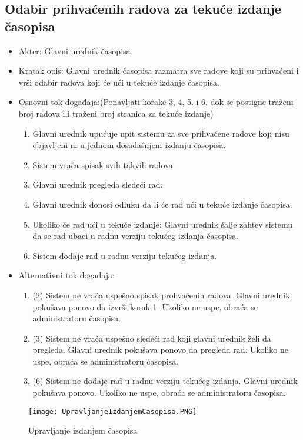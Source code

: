 \documentclass[a4paper]{article}
\begin{document}
\subsection{Odabir prihvaćenih radova za tekuće izdanje časopisa}
\begin{itemize}
    \item Akter: Glavni urednik časopisa
    \item Kratak opis: Glavni urednik časopisa razmatra sve radove koji su prihvaćeni i vrši odabir radova koji će ući u tekuće izdanje časopisa.
    \item Osnovni tok događaja:(Ponavljati korake 3, 4, 5. i 6. dok se postigne traženi broj radova ili traženi broj stranica za tekuće izdanje)
        \begin{enumerate}
            \item Glavni urednik upućuje upit sistemu za sve prihvaćene radove koji nisu objavljeni ni u jednom dosadašnjem izdanju časopisa.
            \item Sistem vraća spisak svih takvih radova.
            \item Glavni urednik pregleda sledeći rad.
            \item Glavni urednik donosi odluku da li će rad ući u tekuće izdanje časopisa.
            \item Ukoliko će rad ući u tekuće izdanje: Glavni urednik šalje zahtev sistemu da se rad ubaci u radnu verziju tekućeg izdanja časopisa.
            \item Sistem dodaje rad u radnu verziju tekućeg izdanja.
        \end{enumerate}
    \item Alternativni tok događaja:
        \begin{enumerate}
            \item  (2) Sistem ne vraća uspešno spisak prohvaćenih radova. Glavni urednik pokušava ponovo da izvrši korak 1. Ukoliko ne uspe, obraća se administratoru časopisa.
            \item (3) Sistem ne vraća uspešno sledeći rad koji glavni urednik želi da pregleda. Glavni urednik pokušava ponovo da pregleda rad. Ukoliko ne uspe, obraća se administratoru časopisa.
            \item (6) Sistem ne dodaje rad u radnu verziju tekučeg izdanja. Glavni urednik pokušava ponovo. Ukoliko ne uspe, obraća se administratoru časopisa.
        \end{enumerate}
\end{itemize}

\begin{figure}[hbt!]
    \centering
    \texttt{[image: UpravljanjeIzdanjemCasopisa.PNG]}
    \caption{Upravljanje izdanjem časopisa}
    \label{fig:my_label}
\end{figure}
\end{document}
